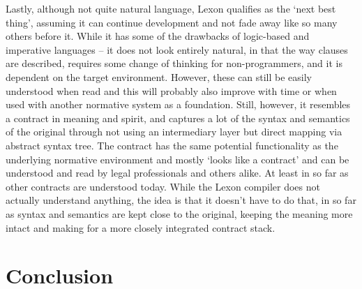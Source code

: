 \documentclass[conference]{IEEEtran}
\begin{document}
Lastly, although not quite natural language, %
Lexon qualifies as the ‘next best thing’, assuming it can continue development and not fade away like so many others before it. While it has some of the drawbacks of logic-based and imperative languages – it does not look entirely natural, in that the way clauses are described, requires some change of thinking for non-programmers, %
and it is dependent on the target environment.
However, these can still be easily understood when read and this will probably also improve with time or when used with another normative system as a foundation. 
Still, however, it resembles a contract in meaning and spirit, and captures a lot of the syntax and semantics of the original through not using an intermediary layer but direct mapping via abstract syntax tree. The contract has the same potential functionality as the underlying normative environment %
and mostly ‘looks like a contract’ and can be understood and read by legal professionals and others alike. At least in so far as other contracts are understood today. %
While the Lexon compiler does not actually understand anything, the idea is that it doesn’t have to do that, in so far as syntax and semantics are kept close to the original, keeping the meaning more intact and making for a more closely integrated contract stack.

\section{Conclusion}
\end{document}
